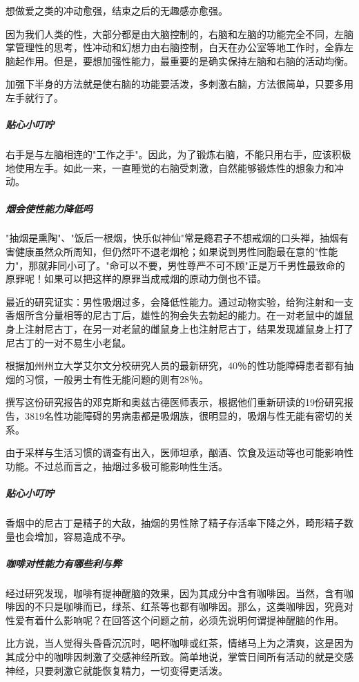 \begin{enumerate}
想做爱之类的冲动愈强，结束之后的无趣感亦愈强。

因为我们人类的性，大部分都是由大脑控制的，右脑和左脑的功能完全不同，左脑掌管理性的思考，性冲动和幻想力由右脑控制，白天在办公室等地工作时，全靠左脑起作用。但是，要想加强性能力，最重要的是确实保持左脑和右脑的活动均衡。

加强下半身的方法就是使右脑的功能要活泼，多刺激右脑，方法很简单，只要多用左手就行了。

\subparagraph{贴心小叮咛}

右手是与左脑相连的"工作之手"。因此，为了锻炼右脑，不能只用右手，应该积极地使用左手。如此一来，一直睡觉的右脑受刺激，自然能够锻炼性的想象力和冲动。

\subparagraph{烟会使性能力降低吗}

"抽烟是熏陶"、"饭后一根烟，快乐似神仙"常是瘾君子不想戒烟的口头禅，抽烟有害健康虽然众所周知，但仍然吓不退老烟枪；如果说到男性同胞最在意的"性能力"，那就非同小可了。"命可以不要，男性尊严不可不顾"正是万千男性最致命的原罪呢！如果可以把这样的原罪当成戒烟的原动力倒也不错。

最近的研究证实：男性吸烟过多，会降低性能力。通过动物实验，给狗注射和一支香烟所含分量相等的尼古丁后，雄性的狗会失去勃起的能力。在一对老鼠中的雄鼠身上注射尼古丁，在另一对老鼠的雌鼠身上也注射尼古丁，结果发现雄鼠身上打了尼古丁的一对不易生小老鼠。

根据加州州立大学艾尔文分校研究人员的最新研究，40％的性功能障碍患者都有抽烟的习惯，一般男士有性无能问题的则有28％。

撰写这份研究报告的邓克斯和奥兹古德医师表示，根据他们重新研读的19份研究报告，3819名性功能障碍的男病患都是吸烟族，很明显的，吸烟与性无能有密切的关系。

由于采样与生活习惯的调查有出入，医师坦承，酗酒、饮食及运动等也可能影响性功能。不过总而言之，抽烟过多极可能影响性生活。

\subparagraph{贴心小叮咛}

香烟中的尼古丁是精子的大敌，抽烟的男性除了精子存活率下降之外，畸形精子数量也会增加，容易造成不孕。

\subparagraph{咖啡对性能力有哪些利与弊}

经过研究发现，咖啡有提神醒脑的效果，因为其成分中含有咖啡因。当然，含有咖啡因的不只是咖啡而已，绿茶、红茶等也都有咖啡因。那么，这类咖啡因，究竟对性爱有着什么影响呢？在回答这个问题之前，必须先说明何谓提神醒脑的作用。

比方说，当人觉得头昏昏沉沉时，喝杯咖啡或红茶，情绪马上为之清爽，这是因为其成分中的咖啡因刺激了交感神经所致。简单地说，掌管日间所有活动的就是交感神经，只要刺激它就能恢复精力，一切变得更活泼。


\end{enumerate}
